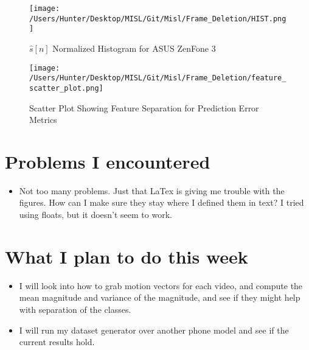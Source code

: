\documentclass[12pt]{article}%
\def\bi{\begin{itemize}     %
\vspace{-0.5em}\setlength\itemsep{0em}}
\begin{document}
\begin{figure}[ht!]
  \centering
  \texttt{[image: /Users/Hunter/Desktop/MISL/Git/Misl/Frame\_Deletion/HIST.png]}
  \caption{$\hat{s}[n]$ Normalized Histogram for ASUS ZenFone 3}
  \label{fig:HIST}
\end{figure}

\begin{figure}[ht!]
  \centering
  \texttt{[image: /Users/Hunter/Desktop/MISL/Git/Misl/Frame\_Deletion/feature\_scatter\_plot.png]}
  \caption{Scatter Plot Showing Feature Separation for Prediction Error Metrics}
  \label{fig:SCATTER}
\end{figure}



\section{Problems I encountered}
\bi
\item Not too many problems. Just that LaTex is giving me trouble with the figures. How can I make sure they stay where I defined them in text? I tried using floats, but it doesn't seem to work.
\end{itemize}

\section{What I plan to do this week}
\bi
\item I will look into how to grab motion vectors for each video, and compute the mean magnitude and variance of the magnitude, and see if they might help with separation of the classes.
\item I will run my dataset generator over another phone model and see if the current results hold.
\end{itemize}



\begin{comment}
\pagebreak
%


%
\end{comment}
\end{document}
